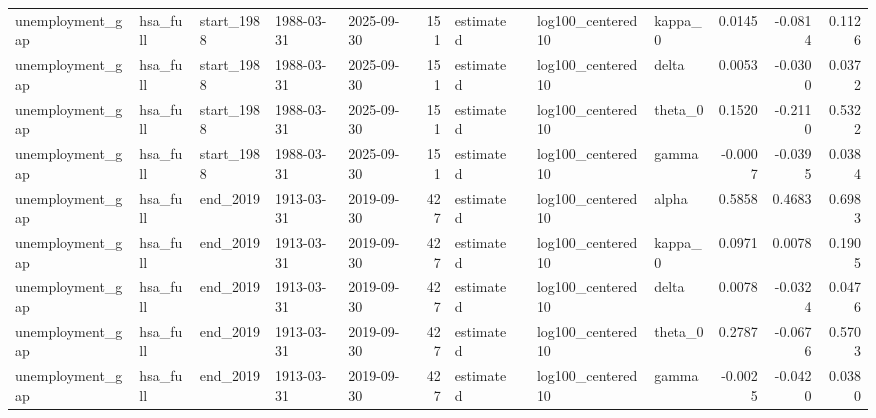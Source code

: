 \begin{tabular}{lllllrllllrrr}
unemployment\_gap & hsa\_full & start\_1988 & 1988-03-31 & 2025-09-30 & 151 & estimated &  & log100\_centered10 & kappa\_0 & 0.0145 & -0.0814 & 0.1126 \\
unemployment\_gap & hsa\_full & start\_1988 & 1988-03-31 & 2025-09-30 & 151 & estimated &  & log100\_centered10 & delta & 0.0053 & -0.0300 & 0.0372 \\
unemployment\_gap & hsa\_full & start\_1988 & 1988-03-31 & 2025-09-30 & 151 & estimated &  & log100\_centered10 & theta\_0 & 0.1520 & -0.2110 & 0.5322 \\
unemployment\_gap & hsa\_full & start\_1988 & 1988-03-31 & 2025-09-30 & 151 & estimated &  & log100\_centered10 & gamma & -0.0007 & -0.0395 & 0.0384 \\
unemployment\_gap & hsa\_full & end\_2019 & 1913-03-31 & 2019-09-30 & 427 & estimated &  & log100\_centered10 & alpha & 0.5858 & 0.4683 & 0.6983 \\
unemployment\_gap & hsa\_full & end\_2019 & 1913-03-31 & 2019-09-30 & 427 & estimated &  & log100\_centered10 & kappa\_0 & 0.0971 & 0.0078 & 0.1905 \\
unemployment\_gap & hsa\_full & end\_2019 & 1913-03-31 & 2019-09-30 & 427 & estimated &  & log100\_centered10 & delta & 0.0078 & -0.0324 & 0.0476 \\
unemployment\_gap & hsa\_full & end\_2019 & 1913-03-31 & 2019-09-30 & 427 & estimated &  & log100\_centered10 & theta\_0 & 0.2787 & -0.0676 & 0.5703 \\
unemployment\_gap & hsa\_full & end\_2019 & 1913-03-31 & 2019-09-30 & 427 & estimated &  & log100\_centered10 & gamma & -0.0025 & -0.0420 & 0.0380 \\
\bottomrule
\end{tabular}

